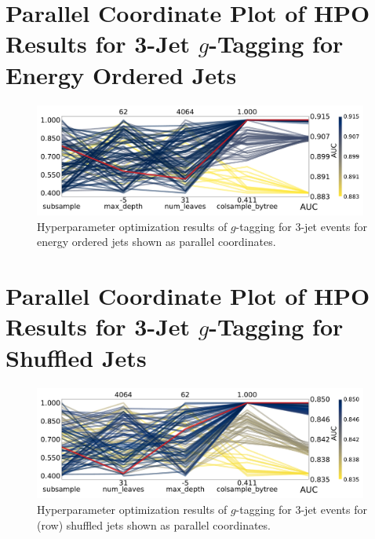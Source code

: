 \section[Parallel Coordinate Plot of HPO Results for 3-Jet g-Tagging for Energy Ordered Jets]{Parallel Coordinate Plot of HPO Results for 3-Jet $g$-Tagging for Energy Ordered Jets}
\begin{figure}[h!]
  \includegraphics[width=0.98\textwidth, trim=0 0 0 0, clip]{figures/quarks/CV_viz-njet=3-name=lf_gtag_energy_ordered_lgb_down_sample=1.00-ML_vars=vertex-selection=b-ejet_min=4-n_iter_RS_lgb=99-n_iter_RS_xgb=9-cdot_cut=0.90-version=19.pdf}
  \caption[Parallel Coordinate Plot of HPO Results for 3-Jet $g$-Tagging for Energy Ordered Jets]
          {Hyperparameter optimization results of $g$-tagging for 3-jet events for energy ordered jets shown as parallel coordinates. 
          } 
  \label{fig:q:CV_res_parallel_coords_g_tag_3j_energy_ordered}
\end{figure}
\vspace{3cm}
\section[Parallel Coordinate Plot of HPO Results for 3-Jet g-Tagging for Shuffled Jets]{Parallel Coordinate Plot of HPO Results for 3-Jet $g$-Tagging for Shuffled Jets}
\begin{figure}[h!]
  \includegraphics[width=0.98\textwidth, trim=0 0 0 0, clip]{figures/quarks/CV_viz-njet=3-name=lf_gtag_shuffled_lgb_down_sample=1.00-ML_vars=vertex-selection=b-ejet_min=4-n_iter_RS_lgb=99-n_iter_RS_xgb=9-cdot_cut=0.90-version=19.pdf}
  \caption[Parallel Coordinate Plot of HPO Results for 3-Jet $g$-Tagging for Shuffled Jets]
          {Hyperparameter optimization results of $g$-tagging for 3-jet events for (row) shuffled jets shown as parallel coordinates. 
          } 
  \label{fig:q:CV_res_parallel_coords_g_tag_3j_shuffled}
\end{figure}
\clearpage


